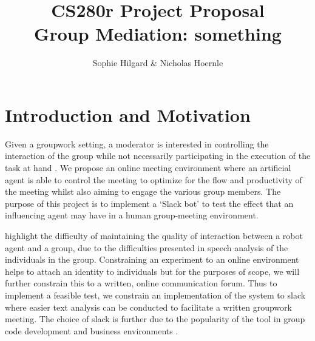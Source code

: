 \documentclass[final,authoryear,11pt,times]{elsarticle}
\begin{document}
\begin{frontmatter}

\title{CS280r Project Proposal \\ Group Mediation: something}


\author{Sophie Hilgard \& Nicholas Hoernle}


\end{frontmatter}

\section{Introduction and Motivation}
	\label{sec:introduction-motivation}
	Given a groupwork setting, a moderator is interested in controlling the interaction of the group while not necessarily participating in the execution of the task at hand \citep{short2015towards}. We propose an online meeting environment where an artificial agent is able to control the meeting to optimize for the flow and productivity of the meeting whilst also aiming to engage the various group members. The purpose of this project is to implement a `Slack bot' to test the effect that an influencing agent may have in a human group-meeting environment.

	\citet{matsuyama2015four} highlight the difficulty of maintaining the quality of interaction between a robot agent and a group, due to the difficulties presented in speech analysis of the individuals in the group. Constraining an experiment to an online environment helps to attach an identity to individuals but for the purposes of scope, we will further constrain this to a written, online communication forum. Thus to implement a feasible test, we constrain an implementation of the system to slack where easier text analysis can be conducted to facilitate a written groupwork meeting. The choice of slack is further due to the popularity of the tool in group code development and business environments \citep{jeffrey2016scientists}\citep{lebeuf2017software}.
\end{document}
